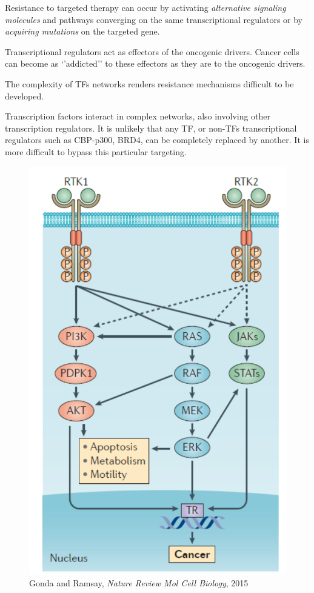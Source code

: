 Resistance to targeted therapy can occur by activating \emph{alternative signaling molecules} and pathways converging on the same transcriptional regulators or by \emph{acquiring mutations} on the targeted gene.

Transcriptional regulators act as effectors of the oncogenic drivers. Cancer cells can become as `'addicted'' to these effectors as they are to the oncogenic drivers.

The complexity of TFs networks renders resistance mechanisms difficult to be developed.

Transcription factors interact in complex networks, also involving other transcription regulators. It is unlikely that any TF, or non-TFs transcriptional regulators such as CBP-p300, BRD4, can be completely replaced by another. It is more difficult to bypass this particular targeting.

\begin{figure}
\centering
\includegraphics{../_resources/Screen_Shot_2022-11-04_at_11-51-12.png}
\caption{Gonda and Ramsay, \emph{Nature Review Mol Cell Biology}, 2015}
\end{figure}

